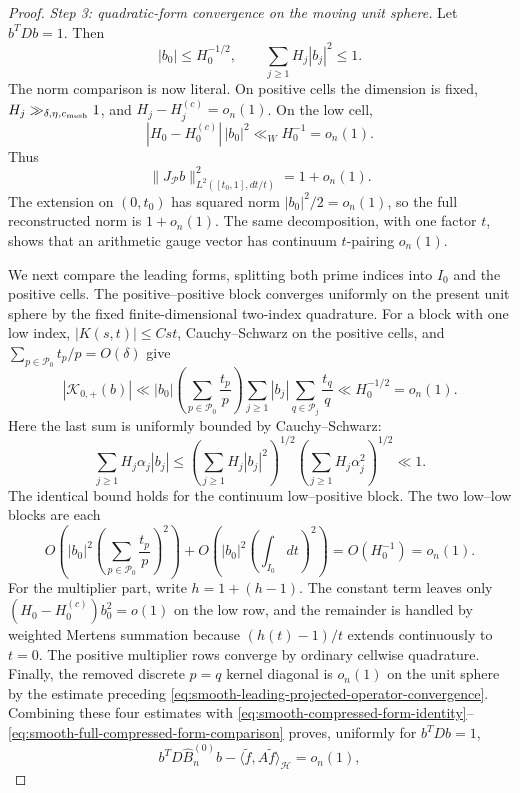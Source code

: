 \documentclass[11pt]{article}
\numberwithin{equation}{section}
\theoremstyle{definition}
\theoremstyle{remark}
\newcommand{\1}{\mathbf 1}
\begin{document}
\begin{proof}
\medskip\noindent
\emph{Step 3: quadratic-form convergence on the moving unit sphere.}\quad
Let \(b^TDb=1\).  Then
\[
 |b_0|\leq H_0^{-1/2},\qquad
 \sum_{j\geq1}H_j|b_j|^2\leq1.
\]
The norm comparison is now literal.  On positive cells the dimension is
fixed, \(H_j\gg_{\delta,\eta,c_{\rm mesh}}1\), and
\(H_j-H_j^{(c)}=o_n(1)\).  On the low cell,
\[
 |H_0-H_0^{(c)}|\,|b_0|^2
       \ll_W H_0^{-1}=o_n(1).
\]
Thus
\[
 \|J_{\mathcal P}b\|_{L^2([t_0,1],dt/t)}^2=1+o_n(1).
\]
The extension on \((0,t_0)\) has squared norm
\(|b_0|^2/2=o_n(1)\), so the full reconstructed norm is \(1+o_n(1)\).
The same decomposition, with one factor \(t\), shows that an arithmetic
gauge vector has continuum \(t\)-pairing \(o_n(1)\).

We next compare the leading forms, splitting both prime indices into
\(I_0\) and the positive cells.  The positive--positive block converges
uniformly on the present unit sphere by the fixed finite-dimensional
two-index quadrature.  For a block with one low index,
\(|K(s,t)|\leq Cst\), Cauchy--Schwarz on the positive cells, and
\(\sum_{p\in\mathcal P_0}t_p/p=O(\delta)\) give
\[
 |\mathscr K_{0,+}(b)|
 \ll |b_0|\left(\sum_{p\in\mathcal P_0}\frac{t_p}{p}\right)
       \sum_{j\geq1}|b_j|
           \sum_{q\in\mathcal P_j}\frac{t_q}{q}
 \ll H_0^{-1/2}=o_n(1).
\]
Here the last sum is uniformly bounded by Cauchy--Schwarz:
\[
 \sum_{j\geq1}H_j\alpha_j|b_j|
 \leq\left(\sum_{j\geq1}H_j|b_j|^2\right)^{1/2}
      \left(\sum_{j\geq1}H_j\alpha_j^2\right)^{1/2}
 \ll1.
\]
The identical bound holds for the continuum low--positive block.  The
two low--low blocks are each
\[
 O\!\left(|b_0|^2
       \left(\sum_{p\in\mathcal P_0}\frac{t_p}{p}\right)^2\right)
   +O\!\left(|b_0|^2
       \left(\int_{I_0}dt\right)^2\right)
 =O(H_0^{-1})=o_n(1).
\]
For the multiplier part, write \(h=1+(h-1)\).  The constant term leaves
only \((H_0-H_0^{(c)})b_0^2=o(1)\) on the low row, and the remainder is
handled by weighted Mertens summation because
\((h(t)-1)/t\) extends continuously to \(t=0\).  The positive
multiplier rows converge by ordinary cellwise quadrature.  Finally, the
removed discrete \(p=q\) kernel diagonal is \(o_n(1)\) on the unit
sphere by the estimate preceding
\eqref{eq:smooth-leading-projected-operator-convergence}.  Combining
these four estimates with
\eqref{eq:smooth-compressed-form-identity}--
\eqref{eq:smooth-full-compressed-form-comparison} proves, uniformly for
\(b^TDb=1\),
\begin{equation}
 b^TD\widehat B_n^{(0)}b-
 \langle\widetilde f,A\widetilde f\rangle_{\mathcal H}=o_n(1),
 \label{eq:smooth-discrete-full-form-comparison}

\end{equation}
\end{proof}
\end{document}
